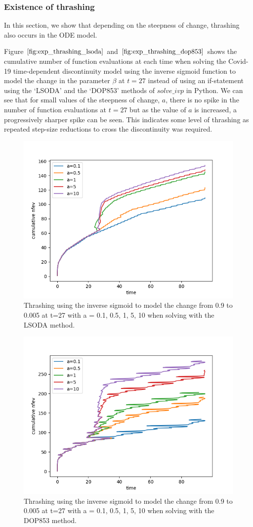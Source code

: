 \subsubsection{Existence of thrashing}
In this section, we show that depending on the steepness of change, thrashing also occurs in the ODE model.

Figure $\ref{fig:exp_thrashing_lsoda}$ and $\ref{fig:exp_thrashing_dop853}$ shows the cumulative number of function evaluations at each time when solving the Covid-19 time-dependent discontinuity model using the inverse sigmoid function to model the change in the parameter $\beta$ at $t=27$ instead of using an if-statement using the `LSODA' and the `DOP853' methods of $solve\_ivp$ in Python. We can see that for small values of the steepness of change, $a$, there is no spike in the number of function evaluations at $t=27$ but as the value of $a$ is increased, a progressively sharper spike can be seen. This indicates some level of thrashing as repeated step-size reductions to cross the discontinuity was required.


\begin{figure}[H]
\centering
\includegraphics[width=0.7\linewidth]{./figures/exp_thrashing_lsoda}
\caption{Thrashing using the inverse sigmoid to model the change from 0.9 to 0.005 at t=27 with a = 0.1, 0.5, 1, 5, 10 when solving with the LSODA method.}
\label{fig:exp_thrashing_lsoda}
\end{figure}

\begin{figure}[H]
\centering
\includegraphics[width=0.7\linewidth]{./figures/exp_thrashing_dop853}
\caption{Thrashing using the inverse sigmoid to model the change from 0.9 to 0.005 at t=27 with a = 0.1, 0.5, 1, 5, 10 when solving with the DOP853 method.}
\label{fig:exp_thrashing_dop853}
\end{figure}

